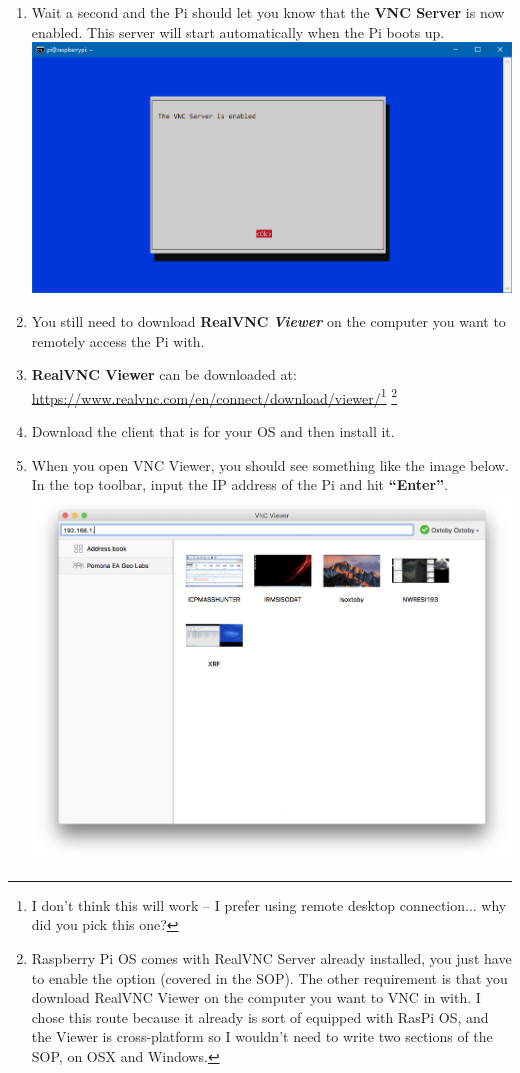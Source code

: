\documentclass{article}
\begin{document}
\begin{enumerate}
  \item Wait a second and the Pi should let you know that the \textbf{VNC Server} is now enabled. This server will start automatically when the Pi boots up.
  \newline
  \newline
  \includegraphics[width=1.00\textwidth]{rcvncconf}
  \item You still need to download \textbf{RealVNC} \textbf{\textit{Viewer}} on the computer you want to remotely access the Pi with.
  \item \textbf{RealVNC Viewer} can be downloaded at:
  \newline
  \url{https://www.realvnc.com/en/connect/download/viewer/}\footnote{I don't think this will work -- I prefer using remote desktop connection... why did you pick this one?} \footnote{Raspberry Pi OS comes with RealVNC Server already installed, you just have to enable the option (covered in the SOP). The other requirement is that you download RealVNC Viewer on the computer you want to VNC in with. I chose this route because it already is sort of equipped with RasPi OS, and the Viewer is cross-platform so I wouldn't need to write two sections of the SOP, on OSX and Windows.}
  \item Download the client that is for your OS and then install it.  
  \item When you open VNC Viewer, you should see something like the image below. In the top toolbar, input the IP address of the Pi and hit \textbf{``Enter''}.
  \includegraphics[width=1.00\textwidth]{realvnc}

\end{enumerate}
\end{document}

